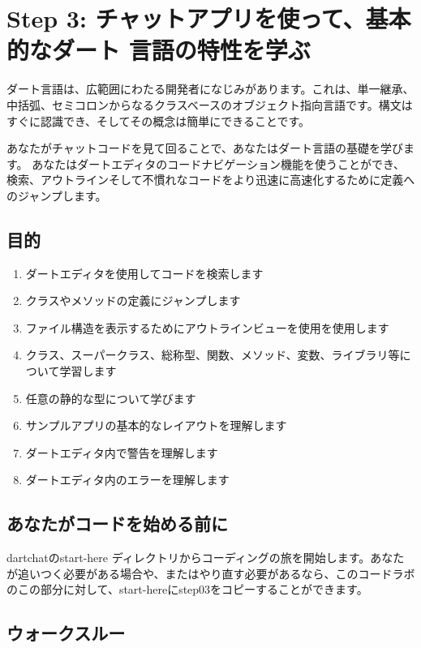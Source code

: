 \section{Step 3: チャットアプリを使って、基本的なダート
言語の特性を学ぶ}

ダート言語は、広範囲にわたる開発者になじみがあります。これは、単一継承、中括弧、セミコロンからなるクラスベースのオブジェクト指向言語です。構文はすぐに認識でき、そしてその概念は簡単にできることです。

あなたがチャットコードを見て回ることで、あなたはダート言語の基礎を学びます。 あなたはダートエディタのコードナビゲーション機能を使うことができ、検索、アウトラインそして不慣れなコードをより迅速に高速化するために定義へのジャンプします。

\subsection{目的}

\begin{enumerate}
\item ダートエディタを使用してコードを検索します
\item クラスやメソッドの定義にジャンプします
\item ファイル構造を表示するためにアウトラインビューを使用を使用します
\item クラス、スーパークラス、総称型、関数、メソッド、変数、ライブラリ等について学習します
\item 任意の静的な型について学びます
\item サンプルアプリの基本的なレイアウトを理解します
\item ダートエディタ内で警告を理解します
\item ダートエディタ内のエラーを理解します
\end{enumerate}

\subsection{あなたがコードを始める前に}

dartchatのstart-here ディレクトリからコーディングの旅を開始します。あなたが追いつく必要がある場合や、またはやり直す必要があるなら、このコードラボのこの部分に対して、start-hereにstep03をコピーすることができます。

\subsection{ウォークスルー}


